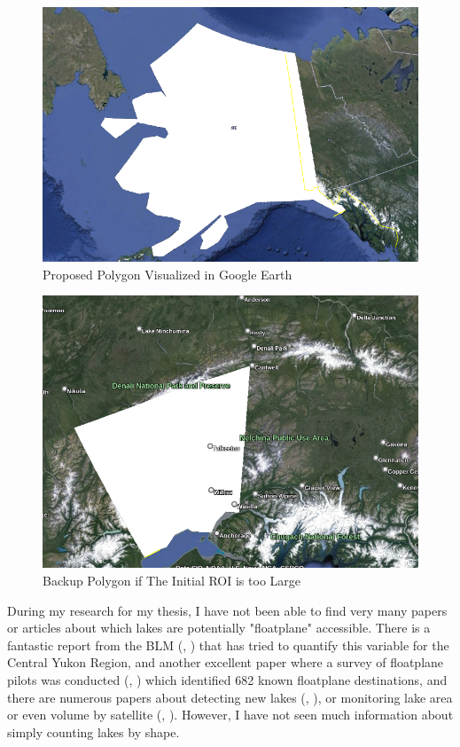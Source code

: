 \documentclass[
    ngerman,american
    ]{scrartcl}
\renewcommand{\cite}[1]{ (\citeauthor{#1}, \citeyear{#1})}
\begin{document}
            \begin{figure}
                \centering
                \includegraphics[width=0.75\linewidth]{polyimage.png}
                \caption{Proposed Polygon Visualized in Google Earth}
                \label{fig:akpoly}
            \end{figure}

            \begin{figure}
                \centering
                \includegraphics[width=0.75\linewidth]{susitnaroi.png}
                \caption{Backup Polygon if The Initial ROI is too Large}
                \label{fig:susitna}
            \end{figure}
            

        
        
            During my research for my thesis, I have not been able to find very many papers or articles about which lakes are potentially "floatplane" accessible.  There is a fantastic report from the BLM \cite{trammel2016} that has tried to quantify this variable for the Central Yukon Region, and another excellent paper where a survey of floatplane pilots was conducted \cite{schwoerer2022flight} which identified 682 known floatplane destinations, and there are numerous papers about detecting new lakes \cite{zhang2014lakes}, or monitoring lake area or even volume by satellite \cite{sima2013using}.  However, I have not seen much information about simply counting lakes by shape.
\end{document}
